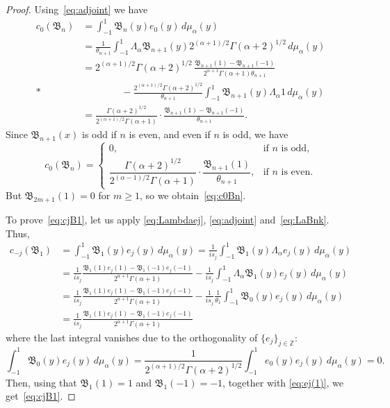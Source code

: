 \documentclass[10pt,a4paper]{article}
\theoremstyle{plain}
\theoremstyle{definition}
\numberwithin{equation}{section} %
\newcommand{\La}{\Lambda_{\alpha}}
\newcommand{\mua}{\mu_{\alpha}}
\newcommand{\B}{\mathfrak{B}}
\newcommand{\ZZ}{\mathbb{Z}}
\begin{document}
\begin{proof}
Using~\eqref{eq:adjoint} we have
\begin{align*}
  c_0(\B_n) &= \int_{-1}^{1} \B_n(y)e_{0}(y)\,d\mua(y)
  \\
  &= \frac{1}{\theta_{n+1}} \int_{-1}^1 \La \B_{n+1}(y)
  2^{(\alpha+1)/2}\Gamma(\alpha+2)^{1/2} \,d\mua(y)
  \\
  &= 2^{(\alpha+1)/2}\Gamma(\alpha+2)^{1/2} \,
  \frac{\B_{n+1}(1) - \B_{n+1}(-1)}{2^{\alpha+1}\Gamma(\alpha+1)\theta_{n+1}}
  \\*
  &\qquad\qquad - \frac{2^{(\alpha+1)/2}\Gamma(\alpha+2)^{1/2}}{\theta_{n+1}}
  \int_{-1}^1 \B_{n+1}(y) \La 1 \,d\mua(y)
  \\
  &= \frac{\Gamma(\alpha+2)^{1/2}}{2^{(\alpha+1)/2}\Gamma(\alpha+1)}
  \cdot \frac{\B_{n+1}(1) - \B_{n+1}(-1)}{\theta_{n+1}}.
\end{align*}
Since $\B_{n+1}(x)$ is odd if $n$ is even, and even if $n$ is odd, we have
\begin{equation*}
  c_0(\B_n) =
  \begin{cases}
  0, & \text{if $n$ is odd,}
  \\
  \dfrac{\Gamma(\alpha+2)^{1/2}}{2^{(\alpha-1)/2}\Gamma(\alpha+1)}
  \cdot \dfrac{\B_{n+1}(1)}{\theta_{n+1}}, & \text{if $n$ is even.}
  \end{cases}
\end{equation*}
But $\B_{2m+1}(1) = 0$ for $m\ge1$, so we obtain~\eqref{eq:c0Bn}.

To prove~\eqref{eq:cjB1}, let us apply \eqref{eq:Lambdaej}, \eqref{eq:adjoint} and~\eqref{eq:LaBnk}. Thus,
\begin{align*}
  c_{-j}(\B_{1}) &= \int_{-1}^{1} \B_{1}(y) e_{j}(y)\, d\mua(y)
  = \frac{1}{is_j} \int_{-1}^{1} \B_{1}(y) \La e_{j}(y)\, d\mua(y) \\
  &= \frac{1}{is_j}
  \frac{\B_1(1) e_{j}(1) - \B_1(-1) e_{j}(-1)}{2^{\alpha+1}\Gamma(\alpha+1)}
  - \frac{1}{is_j} \int_{-1}^{1} \La \B_1(y) e_{j}(y)\, d\mua(y) \\
  &= \frac{1}{is_j}
  \frac{\B_1(1) e_{j}(1) - \B_1(-1) e_{j}(-1)}{2^{\alpha+1}\Gamma(\alpha+1)}
  - \frac{1}{is_j} \frac{1}{\theta_1} \int_{-1}^{1} \B_0(y) e_{j}(y)\, d\mua(y) \\
  &= \frac{1}{is_j}
  \frac{\B_1(1) e_{j}(1) - \B_1(-1) e_{j}(-1)}{2^{\alpha+1}\Gamma(\alpha+1)}
\end{align*}
where the last integral vanishes due to the orthogonality of $\{e_{j}\}_{j\in\ZZ}$:
\[
  \int_{-1}^{1} \B_0(y) e_{j}(y)\, d\mua(y)
  = \frac{1}{2^{(\alpha+1)/2}\Gamma(\alpha+2)^{1/2}}
  \int_{-1}^{1} e_{0}(y) e_{j}(y)\, d\mua(y) = 0.
\]
Then, using that $\B_1(1) = 1$ and $\B_1(-1) = -1$, together with \eqref{eq:ej(1)},
we get~\eqref{eq:cjB1}.


\end{proof}
\end{document}
